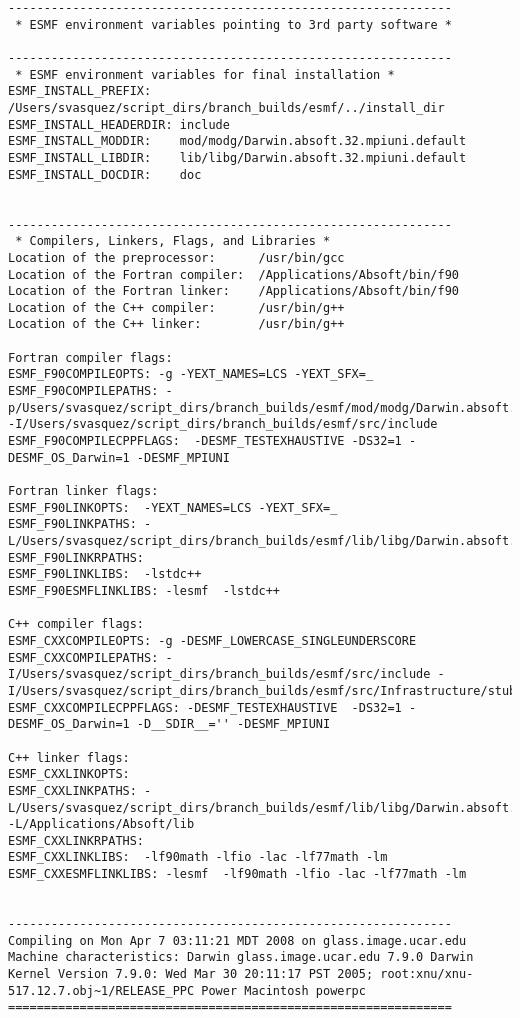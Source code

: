 \begin{verbatim}
--------------------------------------------------------------
 * ESMF environment variables pointing to 3rd party software *
 
--------------------------------------------------------------
 * ESMF environment variables for final installation *
ESMF_INSTALL_PREFIX:    /Users/svasquez/script_dirs/branch_builds/esmf/../install_dir
ESMF_INSTALL_HEADERDIR: include
ESMF_INSTALL_MODDIR:    mod/modg/Darwin.absoft.32.mpiuni.default
ESMF_INSTALL_LIBDIR:    lib/libg/Darwin.absoft.32.mpiuni.default
ESMF_INSTALL_DOCDIR:    doc
 
 
--------------------------------------------------------------
 * Compilers, Linkers, Flags, and Libraries *
Location of the preprocessor:      /usr/bin/gcc
Location of the Fortran compiler:  /Applications/Absoft/bin/f90
Location of the Fortran linker:    /Applications/Absoft/bin/f90
Location of the C++ compiler:      /usr/bin/g++
Location of the C++ linker:        /usr/bin/g++

Fortran compiler flags:
ESMF_F90COMPILEOPTS: -g -YEXT_NAMES=LCS -YEXT_SFX=_
ESMF_F90COMPILEPATHS: -p/Users/svasquez/script_dirs/branch_builds/esmf/mod/modg/Darwin.absoft.32.mpiuni.default -I/Users/svasquez/script_dirs/branch_builds/esmf/src/include
ESMF_F90COMPILECPPFLAGS:  -DESMF_TESTEXHAUSTIVE -DS32=1 -DESMF_OS_Darwin=1 -DESMF_MPIUNI

Fortran linker flags:
ESMF_F90LINKOPTS:  -YEXT_NAMES=LCS -YEXT_SFX=_
ESMF_F90LINKPATHS: -L/Users/svasquez/script_dirs/branch_builds/esmf/lib/libg/Darwin.absoft.32.mpiuni.default
ESMF_F90LINKRPATHS: 
ESMF_F90LINKLIBS:  -lstdc++
ESMF_F90ESMFLINKLIBS: -lesmf  -lstdc++

C++ compiler flags:
ESMF_CXXCOMPILEOPTS: -g -DESMF_LOWERCASE_SINGLEUNDERSCORE
ESMF_CXXCOMPILEPATHS: -I/Users/svasquez/script_dirs/branch_builds/esmf/src/include -I/Users/svasquez/script_dirs/branch_builds/esmf/src/Infrastructure/stubs/mpiuni
ESMF_CXXCOMPILECPPFLAGS: -DESMF_TESTEXHAUSTIVE  -DS32=1 -DESMF_OS_Darwin=1 -D__SDIR__='' -DESMF_MPIUNI

C++ linker flags:
ESMF_CXXLINKOPTS: 
ESMF_CXXLINKPATHS: -L/Users/svasquez/script_dirs/branch_builds/esmf/lib/libg/Darwin.absoft.32.mpiuni.default -L/Applications/Absoft/lib
ESMF_CXXLINKRPATHS: 
ESMF_CXXLINKLIBS:  -lf90math -lfio -lac -lf77math -lm
ESMF_CXXESMFLINKLIBS: -lesmf  -lf90math -lfio -lac -lf77math -lm


--------------------------------------------------------------
Compiling on Mon Apr 7 03:11:21 MDT 2008 on glass.image.ucar.edu
Machine characteristics: Darwin glass.image.ucar.edu 7.9.0 Darwin Kernel Version 7.9.0: Wed Mar 30 20:11:17 PST 2005; root:xnu/xnu-517.12.7.obj~1/RELEASE_PPC Power Macintosh powerpc
==============================================================

\end{verbatim}


